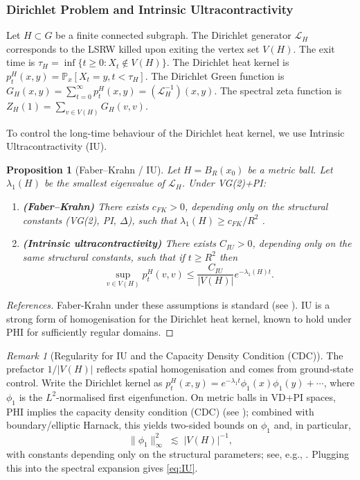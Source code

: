 \documentclass{article}
\numberwithin{equation}{section}
\newtheorem{proposition}[theorem]{Proposition}
\theoremstyle{definition}
\theoremstyle{remark}
\newtheorem{remark}[theorem]{Remark}
\newcommand{\LL}{\mathcal{L}}
\newcommand{\Prob}{\mathbb{P}}
\begin{document}
\subsubsection{Dirichlet Problem and Intrinsic Ultracontractivity}
Let $H \subset G$ be a finite connected subgraph.
The Dirichlet generator $\LL_H$ corresponds to the LSRW killed upon exiting the vertex set $V(H)$. The exit time is $\tau_H = \inf\{t \geq 0 : X_t \notin V(H)\}$.
The Dirichlet heat kernel is $p_t^H(x,y) = \Prob_x[X_t = y, t < \tau_H]$. The Dirichlet Green function is $G_H(x,y) = \sum_{t=0}^{\infty} p_t^H(x,y) = (\LL_H^{-1})(x,y)$. The spectral zeta function is $Z_H(1) = \sum_{v \in V(H)} G_H(v,v)$.

To control the long-time behaviour of the Dirichlet heat kernel, we use Intrinsic Ultracontractivity (IU).

\begin{proposition}[Faber--Krahn / IU]\label{prop:IU}
Let $H=B_R(x_0)$ be a metric ball. Let $\lambda_1(H)$ be the smallest eigenvalue of $\LL_H$. Under VG(2)+PI:
\begin{enumerate}
    \item \textbf{(Faber--Krahn)} There exists $c_{FK}>0$, depending only on the structural constants (VG(2), PI, $\Delta$), such that $\lambda_1(H)\ge c_{FK}/R^{2}$ \cite[Prop.\,5.1]{BarlowBass04}.
    \item \textbf{(Intrinsic ultracontractivity)} There exists $C_{IU}>0$, depending only on the same structural constants, such that if $t\ge R^{2}$ then
    \begin{equation}\label{eq:IU}
        \sup_{v \in V(H)} p_t^H(v,v) \leq \frac{C_{IU}}{|V(H)|} e^{-\lambda_1(H) t}.
    \end{equation}
\end{enumerate}
\end{proposition}
\begin{proof}[References]
Faber-Krahn under these assumptions is standard (see \cite{Grigoryan09}). IU is a strong form of homogenisation for the Dirichlet heat kernel, known to hold under PHI for sufficiently regular domains.
\end{proof}


\begin{remark}[Regularity for IU and the Capacity Density Condition (CDC)]\label{rem:IU_regularity}
The prefactor $1/|V(H)|$ reflects spatial homogenisation and comes from ground-state control. Write the Dirichlet kernel as
$p_t^H(x,y)=e^{-\lambda_1 t}\phi_1(x)\phi_1(y)+\cdots$, where $\phi_1$ is the $L^2$-normalised first eigenfunction. On metric balls in VD+PI spaces, PHI implies the capacity density condition (CDC) (see \cite[Prop.\,3.5]{BarlowBass04}); combined with boundary/elliptic Harnack, this yields two-sided bounds on $\phi_1$ and, in particular,
\[
  \|\phi_1\|_\infty^2 \;\lesssim\; |V(H)|^{-1},
\]
with constants depending only on the structural parameters; see, e.g., \cite{BarlowBassKumagai09, BassKumagai08, Grigoryan09}. Plugging this into the spectral expansion gives \eqref{eq:IU}.
\end{remark}
\end{document}
